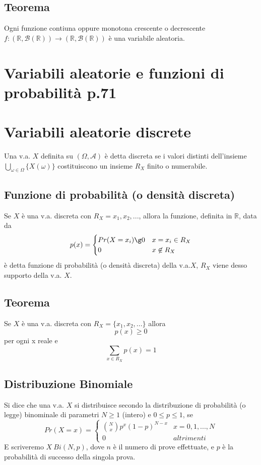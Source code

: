 \documentclass[12pt]{report}
\begin{document}
  \subsection{Teorema}
  Ogni funzione contiuna oppure monotona crescente o decrescente $f:(\mathbb{R},\mathcal{B}(\mathbb{R})) \rightarrow (\mathbb{R},\mathcal{B}(\mathbb{R})) $ è una variabile aleatoria.

  \section{Variabili aleatorie e funzioni di probabilità p.71}
  \section{Variabili aleatorie discrete}
  Una v.a. $X$ definita su $(\Omega, \mathcal{A})$ è detta discreta se i valori distinti dell'insieme $\bigcup_{\omega \in \Omega} \{ {X(\omega)} \}$ costituiscono un insieme $R_X$ finito o numerabile.

  \subsection{Funzione di probabilità (o densità discreta)}
  Se $X$ è una v.a. discreta con $R_X = {x_1,x_2,...}$, allora la funzione, definita in $\mathbb{R}$, data da
  \[
    p(x) =
      \begin{cases}
         Pr(X = x_i) \g 0 & x = x_i \in R_X \\
         0  & x \not\in R_X
      \end{cases}
  \]
  è detta funzione di probabilità (o densità discreta) della v.a.$X$, $R_X$ viene desso supporto della v.a. $X$.

  \subsection{Teorema}
  Se $X$ è una v.a. discreta con $R_X = \{ x_1,x_2,... \}$ allora
  \[ p(x) \geq 0 \] per ogni x reale e \[ \sum_{x\in R_X} p(x) = 1 \]

  \subsection{Distribuzione Binomiale}
  Si dice che una v.a. $X$ si distribuisce secondo la distribuzione di probabilità (o legge) binominale di parametri $N \geq 1$ (intero) e $0 \leq p \leq 1$, se
  \[
    Pr(X = x) =
      \begin{cases}
          \binom{N}{x}p^x(1-p)^{N-x} & x = 0, 1, ..., N \\
          0 & altrimenti
      \end{cases}
  \]
   E scriveremo $ X ~ Bi(N,p) $, dove $n$ è il numero di prove effettuate, e $p$ è la probabilità di successo della singola prova.
\end{document}
